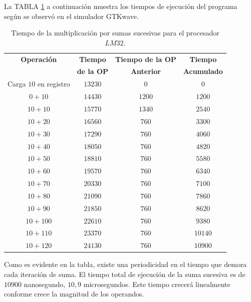 \documentclass[twocolumn]{IEEEtran}
\begin{document}
\noindent
La TABLA \ref{tab1} a continuación muestra los tiempos de ejecución del programa según se observó en el simulador GTKwave.
\begin{table}[H]
	\centering
\begin{tabular}{|c|c|c|c|}\hline
\textbf{Operación} & \textbf{Tiempo} & \textbf{Tiempo de la OP} & \textbf{Tiempo} \\
 & \textbf{de la OP} & \textbf{Anterior} & \textbf{Acumulado} \\ \hline
Carga $10$ en registro & $13230$ & $0$ & $0$ \\ \hline
$0+10$ & $14430$ & $1200$ & $1200$ \\ \hline
$10+10$ & $15770$ & $1340$ & $2540$ \\ \hline
$10+20$ & $16560$ & $760$ & $3300$ \\ \hline
$10+30$ & $17290$ & $760$ & $4060$ \\ \hline
$10+40$ & $18050$ & $760$ & $4820$ \\ \hline
$10+50$ & $18810$ & $760$ & $5580$ \\ \hline
$10+60$ & $19570$ & $760$ & $6340$ \\ \hline
$10+70$ & $20330$ & $760$ & $7100$ \\ \hline
$10+80$ & $21090$ & $760$ & $7860$ \\ \hline
$10+90$ & $21850$ & $760$ & $8620$ \\ \hline
$10+100$ & $22610$ & $760$ & $9380$ \\ \hline
$10+110$ & $23370$ & $760$ & $10140$ \\ \hline
$10+120$ & $24130$ & $760$ & $10900$ \\ \hline
    \end{tabular}
	\caption{Tiempo de la multiplicación por sumas sucesivas para el procesador $LM32$.}
	\label{tab1}
\end{table}
\noindent
Como es evidente en la tabla, existe una periodicidad en el tiempo que demora cada iteración de suma. El tiempo total de ejecución de la suma sucesiva es de $10900$ nanosegundo, $10,9$ microsegundos. Este tiempo crecerá linealmente conforme crece la magnitud de los operandos.
\end{document}
